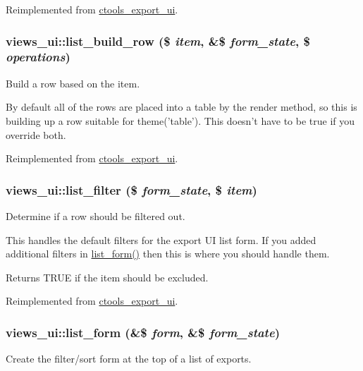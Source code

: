 Reimplemented from \hyperlink{classctools__export__ui_a6e2c9b8dca7d4f8ec8d7badaa1b51f48}{ctools\_\-export\_\-ui}.\hypertarget{classviews__ui_a195a6a1e5b21641032447fb474291e68}{
\subsubsection[{list\_\-build\_\-row}]{\setlength{\rightskip}{0pt plus 5cm}views\_\-ui::list\_\-build\_\-row (\$ {\em item}, \/  \&\$ {\em form\_\-state}, \/  \$ {\em operations})}}
\label{classviews__ui_a195a6a1e5b21641032447fb474291e68}
Build a row based on the item.

By default all of the rows are placed into a table by the render method, so this is building up a row suitable for theme('table'). This doesn't have to be true if you override both. 

Reimplemented from \hyperlink{classctools__export__ui_ad72f3d7170f48e0d0cb1dacb2926bb78}{ctools\_\-export\_\-ui}.\hypertarget{classviews__ui_a1b35936c70aff9359beb8d515af9e8ec}{
\subsubsection[{list\_\-filter}]{\setlength{\rightskip}{0pt plus 5cm}views\_\-ui::list\_\-filter (\$ {\em form\_\-state}, \/  \$ {\em item})}}
\label{classviews__ui_a1b35936c70aff9359beb8d515af9e8ec}
Determine if a row should be filtered out.

This handles the default filters for the export UI list form. If you added additional filters in \hyperlink{classviews__ui_a9f2606bd8902df2f4b1fe3a9a55c9906}{list\_\-form()} then this is where you should handle them.

\begin{DoxyReturn}{Returns}
TRUE if the item should be excluded. 
\end{DoxyReturn}


Reimplemented from \hyperlink{classctools__export__ui_aed7f3b1a8d7564168f89e2b450c6aa4a}{ctools\_\-export\_\-ui}.\hypertarget{classviews__ui_a9f2606bd8902df2f4b1fe3a9a55c9906}{
\subsubsection[{list\_\-form}]{\setlength{\rightskip}{0pt plus 5cm}views\_\-ui::list\_\-form (\&\$ {\em form}, \/  \&\$ {\em form\_\-state})}}
\label{classviews__ui_a9f2606bd8902df2f4b1fe3a9a55c9906}
Create the filter/sort form at the top of a list of exports.

